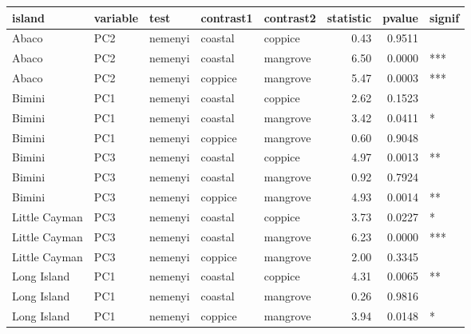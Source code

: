 
\begin{tabular}{lllllrrl}
\toprule
island & variable & test & contrast1 & contrast2 & statistic & pvalue & signif\\
\midrule
Abaco & PC2 & nemenyi & coastal & coppice & 0.43 & 0.9511 & \\
Abaco & PC2 & nemenyi & coastal & mangrove & 6.50 & 0.0000 & ***\\
Abaco & PC2 & nemenyi & coppice & mangrove & 5.47 & 0.0003 & ***\\
Bimini & PC1 & nemenyi & coastal & coppice & 2.62 & 0.1523 & \\
Bimini & PC1 & nemenyi & coastal & mangrove & 3.42 & 0.0411 & *\\
\addlinespace
Bimini & PC1 & nemenyi & coppice & mangrove & 0.60 & 0.9048 & \\
Bimini & PC3 & nemenyi & coastal & coppice & 4.97 & 0.0013 & **\\
Bimini & PC3 & nemenyi & coastal & mangrove & 0.92 & 0.7924 & \\
Bimini & PC3 & nemenyi & coppice & mangrove & 4.93 & 0.0014 & **\\
Little Cayman & PC3 & nemenyi & coastal & coppice & 3.73 & 0.0227 & *\\
\addlinespace
Little Cayman & PC3 & nemenyi & coastal & mangrove & 6.23 & 0.0000 & ***\\
Little Cayman & PC3 & nemenyi & coppice & mangrove & 2.00 & 0.3345 & \\
Long Island & PC1 & nemenyi & coastal & coppice & 4.31 & 0.0065 & **\\
Long Island & PC1 & nemenyi & coastal & mangrove & 0.26 & 0.9816 & \\
Long Island & PC1 & nemenyi & coppice & mangrove & 3.94 & 0.0148 & *\\
\bottomrule
\end{tabular}
